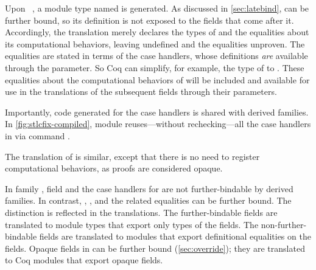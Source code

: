 Upon ~, a module type named  is generated.
%
As discussed in \cref{sec:latebind},  can be further bound,
so its definition is not exposed to the fields that come after it.
Accordingly, the translation  merely declares the types of 
and the equalities about its computational behaviors, leaving  undefined
and the equalities unproven.
%
The equalities are stated in terms of the case handlers,
whose definitions \emph{are} available through the  parameter.
So Coq can simplify, for example, the type of  to
.
These equalities about the computational behaviors of 
will be included and available for use in the translations of the
subsequent fields through their  parameters.

Importantly, code generated for the case handlers is shared with derived families.
In \cref{fig:stlcfix-compiled}, module 
reuses---without rechecking---all the case handlers in
 via command .

The translation of  is similar, except that there is no need to
register computational behaviors, as  proofs are considered opaque.



In family ,
field  and the case handlers for 
are not further-bindable by derived families.
In contrast, , , and the related equalities
can be further bound.
The distinction is reflected in the translations.
The further-bindable fields are translated to module types that export only types of the fields.
The non-further-bindable fields are translated to modules that export definitional equalities
on the fields.
Opaque fields in \Lang can be further bound (\cref{sec:override});
they are translated to Coq modules that export opaque fields.



